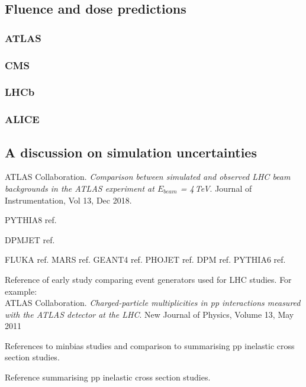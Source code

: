 \subsection{Fluence and dose predictions}
\label{sim-fluences}

\subsubsection{ATLAS}

\subsubsection{CMS}

\subsubsection{LHCb}

\subsubsection{ALICE}

\subsection{A discussion on simulation uncertainties}
\label{sim-SFs}

\begin{thebibliography}{99}

ATLAS Collaboration.
\textit{Comparison between simulated and observed LHC beam backgrounds in the ATLAS experiment at $E_{beam}$ = 4\,TeV}.
Journal of Instrumentation, Vol 13, Dec 2018.

PYTHIA8 ref.

DPMJET ref.

FLUKA ref.
MARS ref.
GEANT4 ref.
PHOJET ref.
DPM ref.
PYTHIA6 ref.

Reference of early study comparing event generators used for LHC studies. For example:\\
ATLAS Collaboration.
\textit{Charged-particle multiplicities in pp interactions measured with the ATLAS detector at the LHC}.
 New Journal of Physics, Volume 13, May 2011

References to minbias studies and comparison to summarising pp inelastic cross section studies.

Reference summarising pp inelastic cross section studies.



\end{thebibliography}

 
